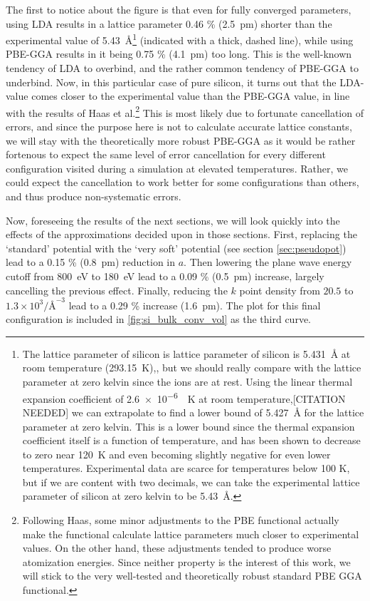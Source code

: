 \documentclass[11pt,bibliography=totoc,index=totoc]{scrbook}   %
\begin{document}
The first to notice about the figure is that even for fully converged parameters, using LDA results in a lattice parameter 0.46 \% (2.5~pm) shorter than the experimental value of 5.43~Å\footnote{The lattice parameter of silicon is lattice parameter of silicon is \SI{5.431}{\angstrom} at room temperature (\SI{293.15}{\kelvin}),\cite{CODATA:2006}, but we should really compare with the lattice parameter at zero kelvin since the ions are at rest.
Using the linear thermal expansion coefficient of \SI{2.6e-6}{\per\kelvin} at room temperature,[CITATION NEEDED]
we can extrapolate to find a lower bound of \SI{5.427}{\angstrom} for the lattice parameter at zero kelvin. This is a lower bound since the thermal expansion coefficient itself is a function of temperature, and has been shown to decrease to zero near \SI{120}{\kelvin} and even becoming slightly negative for even lower temperatures.\cite{Sugino:1990} Experimental data are scarce for temperatures below 100 K, but if we are content with two decimals, we can take the experimental lattice parameter of silicon at zero kelvin to be \SI{5.43}{\angstrom}.}
(indicated with a thick, dashed line), while using PBE-GGA results in it being 0.75 \% (4.1~pm) too long.
This is the well-known tendency of LDA to overbind, and the rather common tendency of PBE-GGA to underbind.
Now, in this particular case of pure silicon, it turns out that the LDA-value comes closer to the experimental value than the PBE-GGA value, in line with the results of Haas et al.\cite{Haas:2010}\footnote{Following Haas, some minor adjustments to the PBE functional actually make the functional calculate lattice parameters much closer to experimental values.
On the other hand, these adjustments tended to produce worse atomization energies. Since neither property is the interest of this work, we will stick to the very well-tested and theoretically robust standard PBE GGA functional.}
This is most likely due to fortunate cancellation of errors,\cite[see e.g.][167]{Martin:2004} and since the purpose here is not to calculate accurate lattice constants, we will stay with the theoretically more robust PBE-GGA as it would be rather fortenous to expect the same level of error cancellation for every different configuration visited during a simulation at elevated temperatures. 
Rather, we could expect the cancellation to work better for some configurations than others, and thus produce non-systematic errors.


Now, foreseeing the results of the next sections, we will look quickly into the effects of the approximations decided upon in those sections. 
First, replacing the `standard' potential with the `very soft' potential (see section \ref{sec:pseudopot}) lead to a 0.15 \% (0.8~pm) reduction in $a$.
Then lowering the plane wave energy cutoff from 800~eV to 180~eV lead to a 0.09 \% (0.5~pm) increase, largely cancelling the previous effect.
Finally, reducing the $k$ point density from $20.5$ to $1.3\times 10^3 / \text{Å}^{-3}$ lead to a 0.29 \% increase (1.6~pm). 
The plot for this final configuration is included in \ref{fig:si_bulk_conv_vol} as the third curve.
\end{document}
